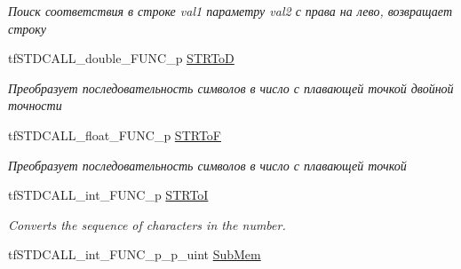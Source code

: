\begin{DoxyCompactItemize}
\begin{DoxyCompactList}\small\item\em Поиск соответствия в строке val1 параметру val2 с права на лево, возвращает строку \end{DoxyCompactList}\item 
\hypertarget{structs_functions_extension_c_p_u_a60f38b868d176a45df13f2515f73c63f}{tf\-S\-T\-D\-C\-A\-L\-L\-\_\-double\-\_\-\-F\-U\-N\-C\-\_\-p \hyperlink{structs_functions_extension_c_p_u_a60f38b868d176a45df13f2515f73c63f}{S\-T\-R\-To\-D}}\label{structs_functions_extension_c_p_u_a60f38b868d176a45df13f2515f73c63f}

\begin{DoxyCompactList}\small\item\em Преобразует последовательность символов в число с плавающей точкой двойной точности \end{DoxyCompactList}\item 
\hypertarget{structs_functions_extension_c_p_u_a305b66f0d05d0bd7314303d3d6595176}{tf\-S\-T\-D\-C\-A\-L\-L\-\_\-float\-\_\-\-F\-U\-N\-C\-\_\-p \hyperlink{structs_functions_extension_c_p_u_a305b66f0d05d0bd7314303d3d6595176}{S\-T\-R\-To\-F}}\label{structs_functions_extension_c_p_u_a305b66f0d05d0bd7314303d3d6595176}

\begin{DoxyCompactList}\small\item\em Преобразует последовательность символов в число с плавающей точкой \end{DoxyCompactList}\item 
\hypertarget{structs_functions_extension_c_p_u_a0e6d36a4031281c32af67ae623495838}{tf\-S\-T\-D\-C\-A\-L\-L\-\_\-int\-\_\-\-F\-U\-N\-C\-\_\-p \hyperlink{structs_functions_extension_c_p_u_a0e6d36a4031281c32af67ae623495838}{S\-T\-R\-To\-I}}\label{structs_functions_extension_c_p_u_a0e6d36a4031281c32af67ae623495838}

\begin{DoxyCompactList}\small\item\em Converts the sequence of characters in the number. \end{DoxyCompactList}\item 
\hypertarget{structs_functions_extension_c_p_u_a33ec97702da3627b218ef00c0d9ab9e3}{tf\-S\-T\-D\-C\-A\-L\-L\-\_\-int\-\_\-\-F\-U\-N\-C\-\_\-p\-\_\-p\-\_\-uint \hyperlink{structs_functions_extension_c_p_u_a33ec97702da3627b218ef00c0d9ab9e3}{Sub\-Mem}}\label{structs_functions_extension_c_p_u_a33ec97702da3627b218ef00c0d9ab9e3}


\end{DoxyCompactItemize}
